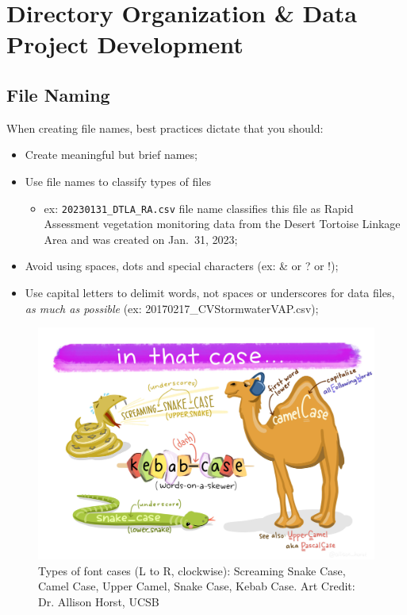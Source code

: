 \documentclass[
]{book}
\providecommand{\tightlist}{%
  \setlength{\itemsep}{0pt}\setlength{\parskip}{0pt}}
\begin{document}
\hypertarget{organization}{%
\chapter{Directory Organization \& Data Project Development}\label{organization}}

\hypertarget{file-naming}{%
\section{File Naming}\label{file-naming}}

When creating file names, best practices dictate that you should:

\begin{itemize}
\tightlist
\item
  Create meaningful but brief names;
\item
  Use file names to classify types of files

  \begin{itemize}
  \tightlist
  \item
    ex: \texttt{20230131\_DTLA\_RA.csv} file name classifies this file as Rapid Assessment vegetation monitoring data from the Desert Tortoise Linkage Area and was created on Jan.~31, 2023;
  \end{itemize}
\item
  Avoid using spaces, dots and special characters (ex: \& or ? or !);
\item
  Use capital letters to delimit words, not spaces or underscores for data files, \emph{as much as possible} (ex: 20170217\_CVStormwaterVAP.csv);
\end{itemize}

\begin{figure}

{\centering \includegraphics[width=0.75\linewidth]{images/case_horst} 

}

\caption{Types of font cases (L to R, clockwise): Screaming Snake Case, Camel Case, Upper Camel, Snake Case, Kebab Case. Art Credit: Dr. Allison Horst, UCSB}\label{fig:case}
\end{figure}
\end{document}
